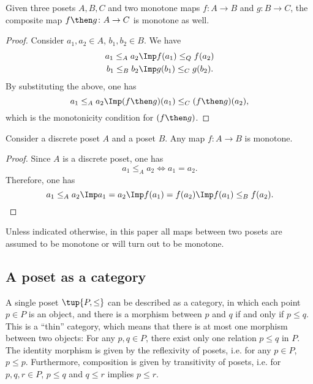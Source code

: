 \begin{lemma}Given three posets $A, B, C$ and two monotone maps $f\colon A
\to B$ and  $g\colon B \to C$, the composite map $f\then g\colon  A \to C$ is
monotone as well.
\end{lemma}
\begin{proof}
Consider $a_1,a_2 \in A$, $b_1,b_2\in B$. We have 
\begin{equation}
\begin{aligned}
        a_1\leq_A a_2 &\Imp f(a_1)\leq_Q f(a_2)\\ 
        b_1\leq_B b_2 &\Imp g(b_1)\leq_C g(b_2).
\end{aligned}
\end{equation}
By substituting the above, one has
\begin{equation}
    a_1\leq_A a_2 \Imp (f\then g)(a_1) \leq_C (f\then g)(a_2),
\end{equation}
which is the monotonicity condition for $(f\then g)$.
\end{proof}

\begin{lemma}
Consider a discrete poset $A$ and a poset $B$. Any map $f\colon A\to B$ is monotone.
\end{lemma}
\begin{proof}
Since $A$ is a discrete poset, one has
\begin{equation}
    a_1\leq_A a_2 \iff a_1=a_2.
\end{equation}
Therefore, one has
\begin{equation}
    a_1\leq_A a_2 \Imp a_1=a_2 \Imp f(a_1)=f(a_2) \Imp f(a_1)\leq_B f(a_2).
\end{equation}
\end{proof}
Unless indicated otherwise, in this paper all maps between two posets
are assumed to be monotone or will turn out to be monotone.

\subsection{A poset as a category}

A single poset $\tup{P, \leq}$ can be described as a category, in which
each point $p\in P$ is an object, and there is a morphism between
$p$ and $q$ if and only if $p \leq q$. This is a ``thin'' category, which means that there is at most one morphism
between two objects: For any $p,q\in P$, there exist only one relation $p\leq q$ in $P$. The identity morphism is given by the reflexivity of posets, i.e. for any $p\in P$, $p\leq p$. Furthermore, composition is given by transitivity of posets, i.e. for $p,q,r \in P$, $p\leq q$ and $q\leq r$ implies $p\leq r$.

